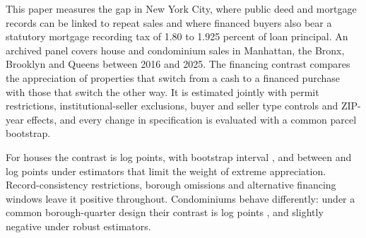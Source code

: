 \documentclass[12pt]{article}
\begin{document}
This paper measures the gap in New York City, where public deed and mortgage records can be linked to repeat sales and where financed buyers also bear a statutory mortgage recording tax of 1.80 to 1.925 percent of loan principal. An archived panel covers house and condominium sales in Manhattan, the Bronx, Brooklyn and Queens between 2016 and 2025. The financing contrast compares the appreciation of properties that switch from a cash to a financed purchase with those that switch the other way. It is estimated jointly with permit restrictions, institutional-seller exclusions, buyer and seller type controls and ZIP-year effects, and every change in specification is evaluated with a common parcel bootstrap.

For houses the contrast is \HouseGap{} log points, with bootstrap interval \HouseCI{}, and between \RobustMin{} and \RobustMax{} log points under estimators that limit the weight of extreme appreciation. Record-consistency restrictions, borough omissions and alternative financing windows leave it positive throughout. Condominiums behave differently: under a common borough-quarter design their contrast is \CondoGap{} log points \CondoCI{}, and slightly negative under robust estimators.
\end{document}
